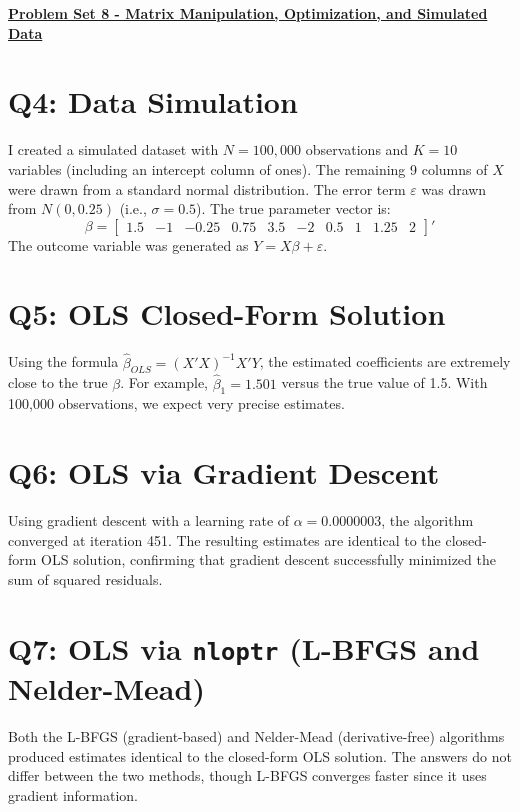\documentclass[12pt]{article}
\begin{document}
\begin{center}
\textbf{\uline{Problem Set 8 - Matrix Manipulation, Optimization, and Simulated Data}}\\[0.5em]
\end{center}

\section*{Q4: Data Simulation}
I created a simulated dataset with $N = 100{,}000$ observations and $K = 10$ variables (including an intercept column of ones). The remaining 9 columns of $X$ were drawn from a standard normal distribution. The error term $\varepsilon$ was drawn from $N(0, 0.25)$ (i.e., $\sigma = 0.5$). The true parameter vector is:
\[
\beta = \begin{bmatrix} 1.5 & -1 & -0.25 & 0.75 & 3.5 & -2 & 0.5 & 1 & 1.25 & 2 \end{bmatrix}'
\]
The outcome variable was generated as $Y = X\beta + \varepsilon$.

\section*{Q5: OLS Closed-Form Solution}
Using the formula $\hat{\beta}_{OLS} = (X'X)^{-1}X'Y$, the estimated coefficients are extremely close to the true $\beta$. For example, $\hat{\beta}_1 = 1.501$ versus the true value of 1.5. With 100,000 observations, we expect very precise estimates.

\section*{Q6: OLS via Gradient Descent}
Using gradient descent with a learning rate of $\alpha = 0.0000003$, the algorithm converged at iteration 451. The resulting estimates are identical to the closed-form OLS solution, confirming that gradient descent successfully minimized the sum of squared residuals.

\section*{Q7: OLS via \texttt{nloptr} (L-BFGS and Nelder-Mead)}
Both the L-BFGS (gradient-based) and Nelder-Mead (derivative-free) algorithms produced estimates identical to the closed-form OLS solution. The answers do not differ between the two methods, though L-BFGS converges faster since it uses gradient information.
\end{document}
